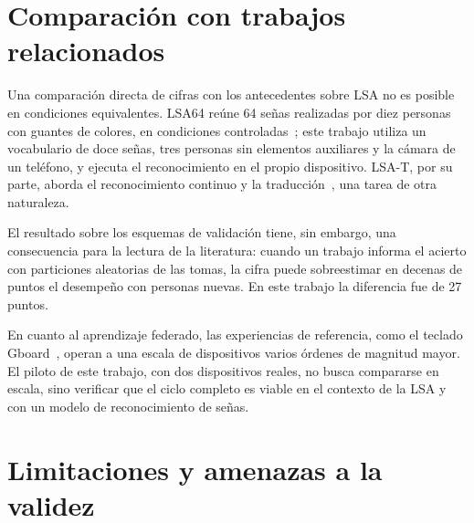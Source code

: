\section{Comparación con trabajos relacionados}

Una comparación directa de cifras con los antecedentes sobre LSA no es posible en condiciones equivalentes. LSA64 reúne 64 señas realizadas por diez personas con guantes de colores, en condiciones controladas~\cite{ronchetti2016lsa64}; este trabajo utiliza un vocabulario de doce señas, tres personas sin elementos auxiliares y la cámara de un teléfono, y ejecuta el reconocimiento en el propio dispositivo. LSA-T, por su parte, aborda el reconocimiento continuo y la traducción~\cite{dalbianco2022lsat}, una tarea de otra naturaleza.

El resultado sobre los esquemas de validación tiene, sin embargo, una consecuencia para la lectura de la literatura: cuando un trabajo informa el acierto con particiones aleatorias de las tomas, la cifra puede sobreestimar en decenas de puntos el desempeño con personas nuevas. En este trabajo la diferencia fue de 27 puntos.

En cuanto al aprendizaje federado, las experiencias de referencia, como el teclado Gboard~\cite{hard2018gboard}, operan a una escala de dispositivos varios órdenes de magnitud mayor. El piloto de este trabajo, con dos dispositivos reales, no busca compararse en escala, sino verificar que el ciclo completo es viable en el contexto de la LSA y con un modelo de reconocimiento de señas.


\section{Limitaciones y amenazas a la validez}

